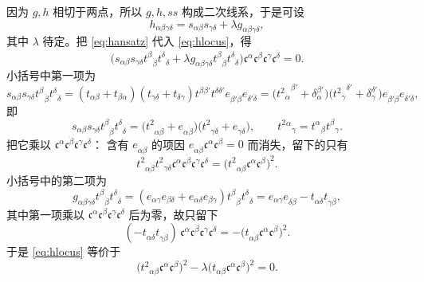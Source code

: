 因为 $g,h$ 相切于两点，所以 $g,h,ss$ 构成二次线系，于是可设
\begin{equation}\label{eq:hansatz}
h_{\alpha\beta\gamma\delta}
=s_{\alpha\beta}s_{\gamma\delta}+\lambda g_{\alpha\beta\gamma\delta},
\end{equation}
其中 $\lambda$ 待定。把 \eqref{eq:hansatz} 代入 \eqref{eq:hlocus}，得
\[
\bigl(s_{\alpha\beta}s_{\gamma\delta}t^\beta{}_{\dot\beta}t^\delta{}_{\dot\delta}
+\lambda g_{\alpha\beta\gamma\delta}t^\beta{}_{\dot\beta}t^\delta{}_{\dot\delta}\bigr)
\mathfrak c^\alpha\mathfrak c^{\dot\beta}\mathfrak c^\gamma\mathfrak c^{\dot\delta}=0 .
\]
小括号中第一项为
\[
s_{\alpha\beta}s_{\gamma\delta}t^\beta{}_{\dot\beta}t^\delta{}_{\dot\delta}
=(t_{\alpha\beta}+t_{\beta\alpha})(t_{\gamma\delta}+t_{\delta\gamma})
t^{\beta\beta'}t^{\delta\delta'}e_{\beta'\dot\beta}e_{\delta'\dot\delta}
=\bigl({{t^2}_\alpha}^{\beta'}+\delta_\alpha^{\beta'}\bigr)
\bigl({{t^2}_\gamma}^{\delta'}+\delta_\gamma^{\delta'}\bigr)
e_{\beta'\dot\beta}e_{\delta'\dot\delta},
\]
即
\[
s_{\alpha\beta}s_{\gamma\delta}t^\beta{}_{\dot\beta}t^\delta{}_{\dot\delta}
=\bigl({t^2}_{\alpha\dot\beta}+e_{\alpha\dot\beta}\bigr)
\bigl({t^2}_{\gamma\dot\delta}+e_{\gamma\dot\delta}\bigr),
\qquad
{{t^2}{}^\alpha}_\gamma={t^\alpha}_\beta{t^\beta}_\gamma .
\]
把它乘以 $\mathfrak c^\alpha\mathfrak c^{\dot\beta}\mathfrak c^\gamma\mathfrak c^{\dot\delta}$：
含有 $e_{\alpha\dot\beta}$ 的项因 $e_{\alpha\dot\beta}\mathfrak c^\alpha\mathfrak c^{\dot\beta}=0$
而消失，留下的只有
\[
{t^2}_{\alpha\dot\beta}{t^2}_{\gamma\dot\delta}
\mathfrak c^\alpha\mathfrak c^{\dot\beta}\mathfrak c^\gamma\mathfrak c^{\dot\delta}
=\bigl({t^2}_{\alpha\dot\beta}\mathfrak c^\alpha\mathfrak c^{\dot\beta}\bigr)^2 .
\]
小括号中的第二项为
\[
g_{\alpha\beta\gamma\delta}t^\beta{}_{\dot\beta}t^\delta{}_{\dot\delta}
=(e_{\alpha\gamma}e_{\beta\delta}+e_{\alpha\delta}e_{\beta\gamma})
t^\beta{}_{\dot\beta}t^\delta{}_{\dot\delta}
=e_{\alpha\gamma}e_{\dot\delta\dot\beta}-t_{\alpha\dot\delta}t_{\gamma\dot\beta},
\]
其中第一项乘以 $\mathfrak c^\alpha\mathfrak c^{\dot\beta}\mathfrak c^\gamma\mathfrak c^{\dot\delta}$
后为零，故只留下
\[
(-t_{\alpha\dot\delta}t_{\gamma\dot\beta})\,
\mathfrak c^\alpha\mathfrak c^{\dot\beta}\mathfrak c^\gamma\mathfrak c^{\dot\delta}
=-\bigl(t_{\alpha\dot\beta}\mathfrak c^\alpha\mathfrak c^{\dot\beta}\bigr)^2 .
\]
于是 \eqref{eq:hlocus} 等价于
\begin{equation}\label{eq:hcond}
\bigl({t^2}_{\alpha\beta}\mathfrak c^\alpha\mathfrak c^\beta\bigr)^2
-\lambda\bigl(t_{\alpha\beta}\mathfrak c^\alpha\mathfrak c^\beta\bigr)^2=0 .
\end{equation}


